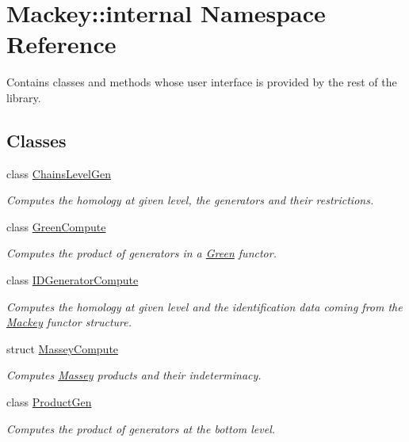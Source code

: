 \hypertarget{namespaceMackey_1_1internal}{}\section{Mackey\+:\+:internal Namespace Reference}
\label{namespaceMackey_1_1internal}


Contains classes and methods whose user interface is provided by the rest of the library.  


\subsection*{Classes}
\begin{DoxyCompactItemize}
\item 
class \hyperlink{classMackey_1_1internal_1_1ChainsLevelGen}{Chains\+Level\+Gen}
\begin{DoxyCompactList}\small\item\em Computes the homology at given level, the generators and their restrictions. \end{DoxyCompactList}\item 
class \hyperlink{classMackey_1_1internal_1_1GreenCompute}{Green\+Compute}
\begin{DoxyCompactList}\small\item\em Computes the product of generators in a \hyperlink{classMackey_1_1Green}{Green} functor. \end{DoxyCompactList}\item 
class \hyperlink{classMackey_1_1internal_1_1IDGeneratorCompute}{I\+D\+Generator\+Compute}
\begin{DoxyCompactList}\small\item\em Computes the homology at given level and the identification data coming from the \hyperlink{namespaceMackey}{Mackey} functor structure. \end{DoxyCompactList}\item 
struct \hyperlink{structMackey_1_1internal_1_1MasseyCompute}{Massey\+Compute}
\begin{DoxyCompactList}\small\item\em Computes \hyperlink{classMackey_1_1Massey}{Massey} products and their indeterminacy. \end{DoxyCompactList}\item 
class \hyperlink{classMackey_1_1internal_1_1ProductGen}{Product\+Gen}
\begin{DoxyCompactList}\small\item\em Computes the product of generators at the bottom level. \end{DoxyCompactList}\end{DoxyCompactItemize}
